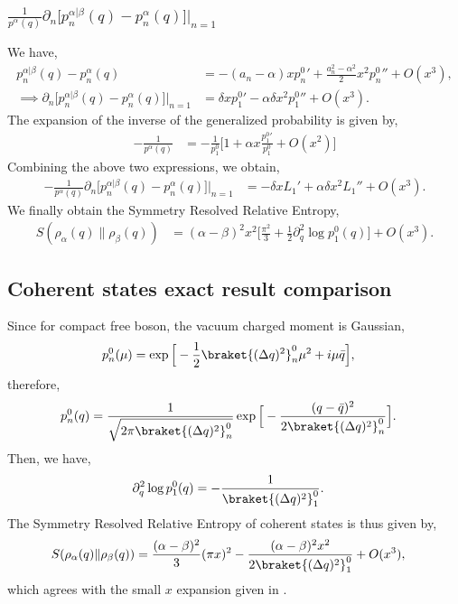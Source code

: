 \documentclass[11pt]{article}
\newcommand{\p}{\partial}
\begin{document}
\subsubsection{\texorpdfstring{$\frac{1}{p^\alpha(q)}\p_n \big[p_n^{\alpha|\beta}(q ) - p_n^\alpha(q)\big]\big|_{n=1}$}{second term of Sym resolved rel entropy}}
We have,
\begin{align}
    p_n^{\alpha|\beta}(q ) - p_n^\alpha(q) &=- (a_n - \alpha )x p_n^0{'}+ \frac{a_n^2-\alpha^2}{2}x^2p_n^0{''}+ O(x^3),
    \\\implies \p_n \big[p_n^{\alpha|\beta}(q ) - p_n^\alpha(q)\big]\big|_{n=1} &= \delta x p_1^0{'} - \alpha \delta x^2 p_1^0{''} + O(x^3).
\end{align}
The expansion of the inverse of the generalized probability is given by,
\begin{align}
    -\frac{1}{p^\alpha(q)} &= -\frac{1}{p_1^0}\Big[ 1+ \alpha x \frac{p_1^0{'}}{p_1^0} + O(x^2)\Big]
\end{align}
Combining the above two expressions, we obtain,
\begin{align}
   - \frac{1}{p^\alpha(q)}\p_n \big[p_n^{\alpha|\beta}(q ) - p_n^\alpha(q)\big]\big|_{n=1}  &=  - \delta x L_1' + \alpha\delta x^2 L_1'' + O(x^3).
\end{align}
We finally obtain the Symmetry Resolved Relative Entropy,
\begin{align}
    S(\rho_\alpha(q)\|\rho_\beta(q)) &= (\alpha-\beta)^2x^2 \Big[ \frac{\pi^2}{3} + \frac{1}{2}\p_q^2\log p_1^0(q)  \Big] + O(x^3).
\end{align}
\subsection{Coherent states exact result comparison}
Since for compact free boson, the vacuum charged moment is Gaussian, 
\begin{align}
    p_n^0(\mu) &= \exp \Big[ -\frac{1}{2}\braket {(\Delta q)^2}_n^0\mu^2 + i\mu \bar q\Big],
\end{align}
therefore,
\begin{align}
    p_n^0(q) &= \frac{1}{\sqrt{2\pi \braket{(\Delta q)^2}_n^0}}\exp \Big[ -\frac{(q-\bar q)^2}{2\braket{(\Delta q)^2}_n^0}\Big].
\end{align}
Then, we have,
\begin{align}
    \p_q^2 \log p_1^0(q) &= -\frac{1}{\braket{(\Delta q)^2}_1^0}.
\end{align}
The Symmetry Resolved Relative Entropy of coherent states is thus given by,
\begin{align}
    S(\rho_\alpha(q)\|\rho_\beta(q)) &= \frac{(\alpha-\beta)^2}{3}(\pi x)^2  - \frac{(\alpha - \beta)^2x^2}{2\braket{(\Delta q)^2}_1^0}+ O(x^3),
\end{align}
which agrees with the small $x$ expansion given in \cite{Chen_2021}.
\end{document}
